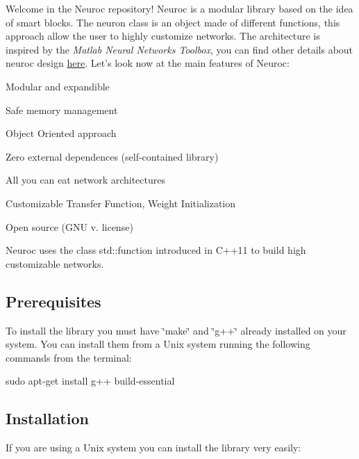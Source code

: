 Welcome in the Neuroc repository! Neuroc is a modular library based on the idea of smart blocks. The neuron class is an object made of different functions, this approach allow the user to highly customize networks. The architecture is inspired by the {\itshape Matlab Neural Networks Toolbox}, you can find other details about neuroc design \hyperlink{md__a_r_c_h_i_t_e_c_t_u_r_e}{here}. Let's look now at the main features of Neuroc\-:


\begin{DoxyItemize}
\item Modular and expandible
\item Safe memory management
\item Object Oriented approach
\item Zero external dependences (self-\/contained library)
\item All you can eat network architectures
\item Customizable Transfer Function, Weight Initialization
\item Open source (G\-N\-U v. license)
\end{DoxyItemize}

Neuroc uses the class std\-::function introduced in C++11 to build high customizable networks.

\subsection*{Prerequisites }

To install the library you must have \char`\"{}make\char`\"{} and \char`\"{}g++\char`\"{} already installed on your system. You can install them from a Unix system running the following commands from the terminal\-:

{\ttfamily sudo apt-\/get install g++ build-\/essential}

\subsection*{Installation }

If you are using a Unix system you can install the library very easily\-:


